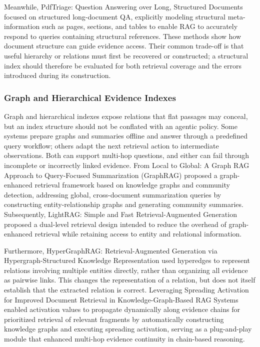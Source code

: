 Meanwhile, PdfTriage: Question Answering over Long, Structured Documents \cite{saad2024pdftriage} focused on structured long-document QA, explicitly modeling structural meta-information such as pages, sections, and tables to enable RAG to accurately respond to queries containing structural references. These methods show how document structure can guide evidence access. Their common trade-off is that useful hierarchy or relations must first be recovered or constructed; a structural index should therefore be evaluated for both retrieval coverage and the errors introduced during its construction.

\subsubsection{Graph and Hierarchical Evidence Indexes}

Graph and hierarchical indexes expose relations that flat passages may conceal, but an index structure should not be conflated with an agentic policy. Some systems prepare graphs and summaries offline and answer through a predefined query workflow; others adapt the next retrieval action to intermediate observations. Both can support multi-hop questions, and either can fail through incomplete or incorrectly linked evidence. From Local to Global: A Graph RAG Approach to Query-Focused Summarization \cite{edge2024graphrag} (GraphRAG) proposed a graph-enhanced retrieval framework based on knowledge graphs and community detection, addressing global, cross-document summarization queries by constructing entity-relationship graphs and generating community summaries. Subsequently, LightRAG: Simple and Fast Retrieval-Augmented Generation \cite{guo2024lightrag} proposed a dual-level retrieval design intended to reduce the overhead of graph-enhanced retrieval while retaining access to entity and relational information.

Furthermore, HyperGraphRAG: Retrieval-Augmented Generation via Hypergraph-Structured Knowledge Representation \cite{he2024hypergraphrag} used hyperedges to represent relations involving multiple entities directly, rather than organizing all evidence as pairwise links. This changes the representation of a relation, but does not itself establish that the extracted relation is correct. Leveraging Spreading Activation for Improved Document Retrieval in Knowledge-Graph-Based RAG Systems \cite{pavlovic2025leveraging} enabled activation values to propagate dynamically along evidence chains for prioritized retrieval of relevant fragments by automatically constructing knowledge graphs and executing spreading activation, serving as a plug-and-play module that enhanced multi-hop evidence continuity in chain-based reasoning.

